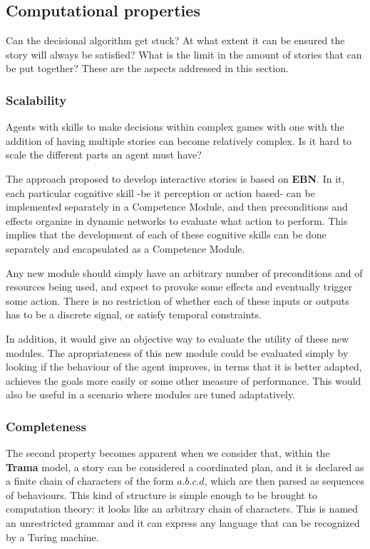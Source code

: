 \documentclass[
		twoside,openright,titlepage,numbers=noenddot,manychapters,
		headinclude,%
                footinclude=false,cleardoublepage=empty,
                BCOR=5mm,
		fontsize=11pt, %
                 enabledeprecatedfontcommands]{scrreprt}
\begin{document}
\subsection{Computational properties}


Can the decisional algorithm get stuck? At what extent it can be ensured the story will always be satisfied? What is the limit in the amount of stories that can be put together? These are the aspects addressed in this section.


\subsubsection{Scalability}
Agents with skills to make decisions within complex games with one with the addition of having multiple stories can become relatively complex. Is it hard to scale the different parts an agent must have?

The approach proposed to develop interactive stories is based on \textbf{EBN}. In it, each particular cognitive skill -be it perception or action based- can be implemented separately in a Competence Module, and then preconditions and effects organize in dynamic networks to evaluate what action to perform. This implies that the development of each of these cognitive skills can be done separately and encapsulated as a Competence Module.
 
 Any new module should simply have an arbitrary number of preconditions and of resources being used, and expect to provoke some effects and eventually trigger some action. There is no restriction of whether each of these inputs or outputs has to be a discrete signal, or satisfy temporal constraints.

In addition, it  would give an objective way to evaluate the utility of these new modules. The apropriateness of this new module could be evaluated simply by looking if the behaviour of the agent improves, in terms that it is better adapted, achieves the goals more easily or some other measure of performance. This would also be useful in a scenario where modules are tuned adaptatively.





\subsubsection{Completeness}
The second property becomes apparent when we consider that, within the \textbf{Trama} model, a story can be considered a coordinated plan, and it is declared as a finite chain of characters of the form $a.b.c.d$, which are then parsed as sequences of behaviours.  This kind of structure is simple enough to be brought to computation theory: it looks like an arbitrary chain of characters. This is named an unrestricted grammar and it can express any language that can be recognized by a Turing machine.  
\end{document}
